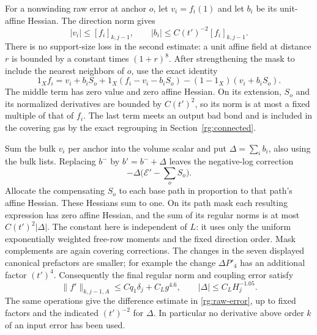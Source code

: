 For a nonwinding raw error at anchor $o$, let $v_i=f_i(1)$ and let
$b_i$ be its unit-affine Hessian.  The direction norm gives
\[
 |v_i|\le[f_i]_{k,j-1},\qquad
 |b_i|\le C(t')^{-2}[f_i]_{k,j-1}.
\]
There is no support-size loss in the second estimate: a unit
affine field at distance $r$ is bounded by a constant times
$(1+r)^8$.  After strengthening the mask to include the nearest
neighbors of $o$, use the exact identity
\begin{equation}
 1_Xf_i=v_i+b_iS_o+
        1_X(f_i-v_i-b_iS_o)
       -(1-1_X)(v_i+b_iS_o).
 \label{rg:normalization-identity}
\end{equation}
The middle term has zero value and zero affine Hessian.  On its
extension, $S_o$ and its normalized derivatives are bounded by
$C(t')^2$, so its norm is at most a fixed multiple of that of
$f_i$.  The last term meets an output bad bond and is included in
the covering gas by the exact regrouping in
Section~\ref{rg:connected}.

Sum the bulk $v_i$ per anchor into the volume scalar and put
$\Delta=\sum_i b_i$, also using the bulk lists.  Replacing $b^-$
by $b'=b^-+\Delta$ leaves the negative-log correction
\begin{equation}
              -\Delta\bigl(\mathcal E'-\sum_oS_o\bigr).
 \label{rg:kinetic-reset}
\end{equation}
Allocate the compensating $S_o$ to each base path in proportion
to that path's affine Hessian.  These Hessians sum to one.  On its
path mask each resulting expression has zero affine Hessian,
and the sum of its regular norms is at most
$C(t')^2|\Delta|$.  The constant here is independent of $L$:
it uses only the uniform exponentially weighted free-row moments
and the fixed direction order.  Mask complements are again
covering corrections.  The changes in the seven displayed
canonical prefactors are smaller; for example the change
$\Delta P'_4$ has an additional factor $(t')^4$.
Consequently the final regular norm and coupling error satisfy
\begin{equation}
 \|f'\|_{k,j-1,A}\le Cq_1\delta_j+C_Lg^{4.6},
 \qquad
 |\Delta|\le C_LH_j^{-1.05}.
 \label{rg:closed-error}
\end{equation}
The same operations give the difference estimate in
\eqref{rg:raw-error}, up to fixed factors and the indicated
$(t')^{-2}$ for $\Delta$.  In particular no derivative above
order $k$ of an input error has been used.

